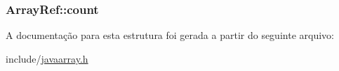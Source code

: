 \subsubsection[{\texorpdfstring{count}{count}}]{ Array\+Ref\+::count}\hypertarget{struct_array_ref_abaaae2def8584a14b087e76d4308aec7}{}\label{struct_array_ref_abaaae2def8584a14b087e76d4308aec7}


A documentação para esta estrutura foi gerada a partir do seguinte arquivo\+:\begin{DoxyCompactItemize}
\item 
include/\hyperlink{javaarray_8h}{javaarray.\+h}\end{DoxyCompactItemize}
